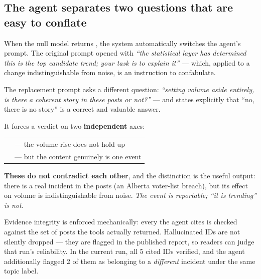 \documentclass[11pt]{article}
\begin{document}
\subsection{The agent separates two questions that are easy to conflate}

When the null model returns \noise, the system automatically switches the
agent's prompt. The original prompt opened with \emph{``the statistical layer has
determined this is the top candidate trend; your task is to explain it''} ---
which, applied to a change indistinguishable from noise, is an instruction to
confabulate.

The replacement prompt asks a different question: \emph{``setting volume aside
entirely, is there a coherent story in these posts or not?''} --- and states
explicitly that ``no, there is no story'' is a correct and valuable answer.

It forces a verdict on two \textbf{independent} axes:

\begin{center}
\begin{tabularx}{0.92\textwidth}{@{}>{\raggedright\arraybackslash}p{} L@{}}
\toprule
{} &  \\
\midrule
{} &  --- the volume rise does not hold up \\
 &  --- but the content genuinely is one event \\
\bottomrule
\end{tabularx}
\end{center}

\begin{keybox}
\textbf{These do not contradict each other}, and the distinction is the useful
output: there is a real incident in the posts (an Alberta voter-list breach),
but its effect on volume is indistinguishable from noise. \emph{The event is
reportable; ``it is trending'' is not.}
\end{keybox}

Evidence integrity is enforced mechanically: every  the agent
cites is checked against the set of posts the tools actually returned.
Hallucinated IDs are not silently dropped --- they are flagged in the published
report, so readers can judge that run's reliability. In the current run, all 5
cited IDs verified, and the agent additionally flagged 2 of them as belonging to
a \emph{different} incident under the same topic label.
\end{document}
